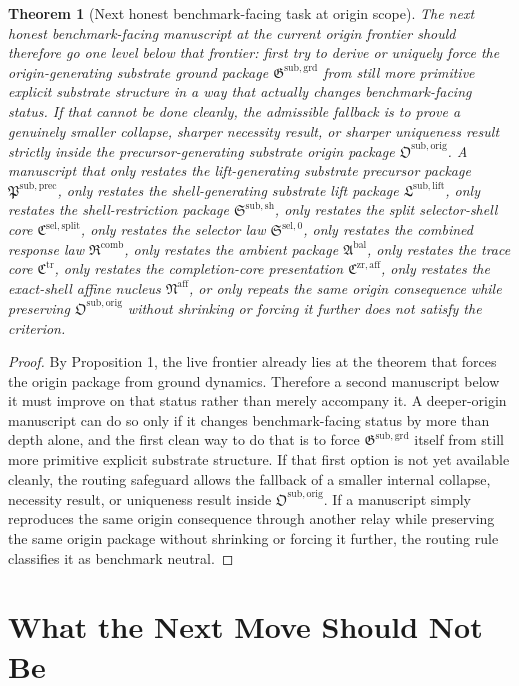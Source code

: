 \documentclass[11pt]{article}
\newcommand{\CompletionCore}{\mathfrak C^{\mathrm{zr,aff}}}
\newcommand{\TraceCore}{\mathfrak C^{\mathrm{tr}}}
\newcommand{\AffineNucleus}{\mathfrak N^{\mathrm{aff}}}
\newcommand{\AmbientPackage}{\mathfrak A^{\mathrm{bal}}}
\newcommand{\CombinedLaw}{\mathfrak R^{\mathrm{comb}}}
\newcommand{\SelectorLaw}{\mathfrak S^{\mathrm{sel},0}}
\newcommand{\SelectorCore}{\mathfrak C^{\mathrm{sel,split}}}
\newcommand{\ShellRestriction}{\mathfrak S^{\mathrm{sub,sh}}}
\newcommand{\LiftPackage}{\mathfrak L^{\mathrm{sub,lift}}}
\newcommand{\PrecursorPackage}{\mathfrak P^{\mathrm{sub,prec}}}
\newcommand{\OriginPackage}{\mathfrak O^{\mathrm{sub,orig}}}
\newcommand{\GroundPackage}{\mathfrak G^{\mathrm{sub,grd}}}
\newtheorem{theorem}{Theorem}
\begin{document}
\begin{theorem}[Next honest benchmark-facing task at origin scope]
The next honest benchmark-facing manuscript at the current origin frontier should therefore go one level below that frontier: first try to derive or uniquely force the origin-generating substrate ground package \(\GroundPackage\) from still more primitive explicit substrate structure in a way that actually changes benchmark-facing status. If that cannot be done cleanly, the admissible fallback is to prove a genuinely smaller collapse, sharper necessity result, or sharper uniqueness result strictly inside the precursor-generating substrate origin package \(\OriginPackage\). A manuscript that only restates the lift-generating substrate precursor package \(\PrecursorPackage\), only restates the shell-generating substrate lift package \(\LiftPackage\), only restates the shell-restriction package \(\ShellRestriction\), only restates the split selector-shell core \(\SelectorCore\), only restates the selector law \(\SelectorLaw\), only restates the combined response law \(\CombinedLaw\), only restates the ambient package \(\AmbientPackage\), only restates the trace core \(\TraceCore\), only restates the completion-core presentation \(\CompletionCore\), only restates the exact-shell affine nucleus \(\AffineNucleus\), or only repeats the same origin consequence while preserving \(\OriginPackage\) without shrinking or forcing it further does not satisfy the criterion.
\end{theorem}

\begin{proof}
By Proposition 1, the live frontier already lies at the theorem that forces the origin package from ground dynamics. Therefore a second manuscript below it must improve on that status rather than merely accompany it. A deeper-origin manuscript can do so only if it changes benchmark-facing status by more than depth alone, and the first clean way to do that is to force \(\GroundPackage\) itself from still more primitive explicit substrate structure. If that first option is not yet available cleanly, the routing safeguard allows the fallback of a smaller internal collapse, necessity result, or uniqueness result inside \(\OriginPackage\). If a manuscript simply reproduces the same origin consequence through another relay while preserving the same origin package without shrinking or forcing it further, the routing rule classifies it as benchmark neutral.
\end{proof}

\section{What the Next Move Should Not Be}
\end{document}
